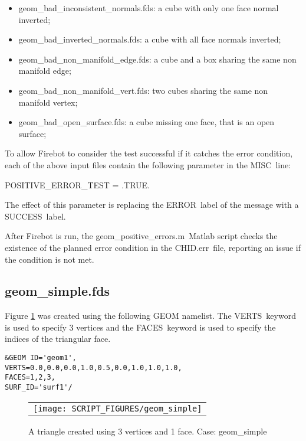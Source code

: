 \documentclass[12pt]{article}
\begin{document}
\begin{itemize}
  \item {\ct geom\_bad\_inconsistent\_normals.fds}: a cube with only one face normal inverted;
  \item {\ct geom\_bad\_inverted\_normals.fds}: a cube with all face normals inverted;
  \item {\ct geom\_bad\_non\_manifold\_edge.fds}: a cube and a box sharing the same non manifold edge;
  \item {\ct geom\_bad\_non\_manifold\_vert.fds}: two cubes sharing the same non manifold vertex; %
  \item {\ct geom\_bad\_open\_surface.fds}: a cube missing one face, that is an open surface;
\end{itemize}

To allow Firebot to consider the test successful if it catches the error condition,
each of the above input files contain the following parameter in the {\ct MISC}\ line:

{\ct POSITIVE\_ERROR\_TEST = .TRUE.}\

The effect of this parameter is replacing the {\ct ERROR}\ label of the message with a {\ct SUCCESS}\ label.

After Firebot is run, the {\ct geom\_positive\_errors.m}\ Matlab script checks the existence
of the planned error condition in the {\ct CHID.err}\ file, reporting an issue if the condition
is not met.

\subsection{geom\_simple.fds}
Figure \ref{fig:geom_simple} was created using the following GEOM namelist.
The {\ct VERTS}\ keyword is used to specify 3 vertices and the {\ct FACES}\ keyword
is used to specify the indices of the triangular face.

{\small
\begin{verbatim}
&GEOM ID='geom1',
VERTS=0.0,0.0,0.0,1.0,0.5,0.0,1.0,1.0,1.0,
FACES=1,2,3,
SURF_ID='surf1'/
\end{verbatim}
}

\begin{figure}
\begin{center}
\begin{tabular}{c}
 \texttt{[image: SCRIPT\_FIGURES/geom\_simple]}
  \end{tabular}
\end{center}
 \caption{A triangle created using 3 vertices and 1 face. Case: geom\_simple}
\label{fig:geom_simple}
\end{figure}
\end{document}
